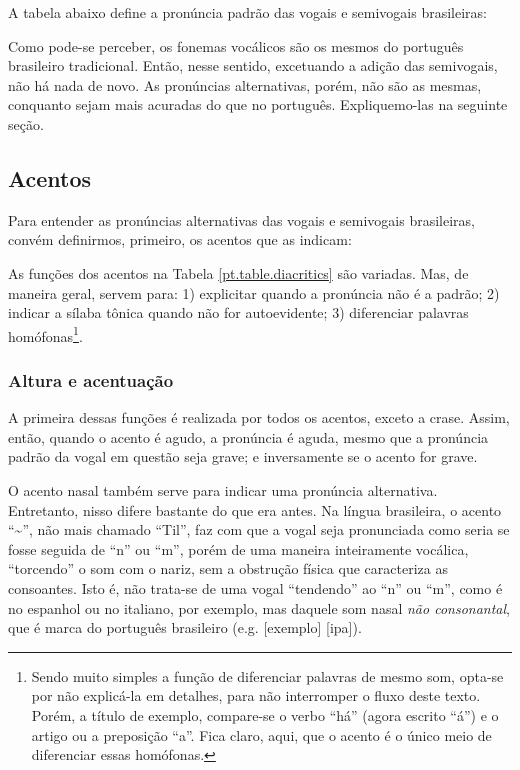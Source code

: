 \documentclass[12pt, a5paper, titlepage]{article}
\begin{document}
\begin{bilingualpages}
    A tabela abaixo define a pronúncia padrão das vogais e semivogais brasileiras:

    \PtTableVowels

    Como pode-se perceber, os fonemas vocálicos são os mesmos do português
    brasileiro tradicional. Então, nesse sentido, excetuando a adição das semivogais, não há
    nada de novo. As pronúncias alternativas, porém, não são as mesmas, conquanto
    sejam mais acuradas do que no português. Expliquemo-las na seguinte seção.

    \subsection{Acentos}
    Para entender as pronúncias alternativas das vogais e semivogais brasileiras,
    convém definirmos, primeiro, os acentos que as indicam:

    \PtTableDiacritics

    As funções dos acentos na Tabela \ref{pt.table.diacritics} são variadas. Mas,
    de maneira geral, servem para: 1) explicitar quando a pronúncia não é a padrão;
    2) indicar a sílaba tônica quando não for autoevidente; 3) diferenciar palavras
    homófonas\footnote{Sendo muito simples a função de diferenciar palavras de mesmo som, opta-se por não explicá-la em detalhes, para não interromper o fluxo deste texto. Porém, a título de exemplo, compare-se o verbo ``há'' (agora escrito ``á'') e o artigo ou a preposição ``a''. Fica claro, aqui, que o acento é o único meio de diferenciar essas homófonas.}.

    \subsubsection{Altura e acentuação}
    A primeira dessas funções é realizada por todos os acentos, exceto a crase.
    Assim, então, quando o acento é agudo, a pronúncia é aguda, mesmo que a
    pronúncia padrão da vogal em questão seja grave; e inversamente se o acento for
    grave.

    O acento nasal também serve para indicar uma pronúncia alternativa. Entretanto,
    nisso difere bastante do que era antes. Na língua brasileira, o acento
    ``\textasciitilde'', não mais chamado ``Til'', faz com que a vogal seja
    pronunciada como seria se fosse seguida de ``n'' ou ``m'', porém de uma maneira
    inteiramente vocálica, ``torcendo'' o som com o nariz, sem a obstrução física
    que caracteriza as consoantes. Isto é, não trata-se de uma vogal ``tendendo''
    ao ``n'' ou ``m'', como é no espanhol ou no italiano, por exemplo, mas daquele
    som nasal \textit{não consonantal}, que é marca do português brasileiro (e.g. [exemplo] [ipa]).


\end{bilingualpages}
\end{document}
